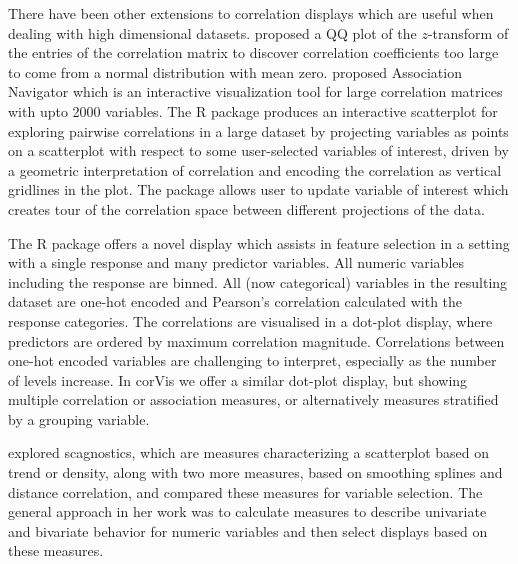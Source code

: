 There have been other extensions to correlation displays which are
useful when dealing with high dimensional datasets.
\citet{hills1969looking} proposed a QQ plot of the \(z\)-transform of
the entries of the correlation matrix to discover correlation
coefficients too large to come from a normal distribution with mean
zero. \citet{buja2016visualization} proposed Association Navigator which
is an interactive visualization tool for large correlation matrices with
upto 2000 variables. The R package  \citep{scorr}
produces an interactive scatterplot for exploring pairwise correlations
in a large dataset by projecting variables as points on a scatterplot
with respect to some user-selected variables of interest, driven by a
geometric interpretation of correlation and encoding the correlation as
vertical gridlines in the plot. The package allows user to update
variable of interest which creates tour of the correlation space between
different projections of the data.

The R package  offers a novel display which
assists in feature selection in a setting with a single response and
many predictor variables. All numeric variables including the response
are binned. All (now categorical) variables in the resulting dataset are
one-hot encoded and Pearson's correlation calculated with the response
categories. The correlations are visualised in a dot-plot display, where
predictors are ordered by maximum correlation magnitude. Correlations
between one-hot encoded variables are challenging to interpret,
especially as the number of levels increase. In corVis we offer a
similar dot-plot display, but showing multiple correlation or
association measures, or alternatively measures stratified by a grouping
variable.

\citet{grimm2017kennzahlenbasierte} explored scagnostics, which are
measures characterizing a scatterplot based on trend or density, along
with two more measures, based on smoothing splines and distance
correlation, and compared these measures for variable selection. The
general approach in her work was to calculate measures to describe
univariate and bivariate behavior for numeric variables and then select
displays based on these measures.

